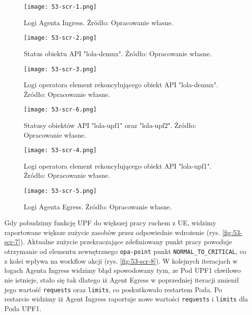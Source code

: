\begin{figure}[!h]
    \centering \texttt{[image: 53-scr-1.png]}
    \caption{Logi Agenta Ingress. Źródło: Opracowanie własne.}\label{fig:53-scr-1}
\end{figure}

\begin{figure}[!h]
    \centering \texttt{[image: 53-scr-2.png]}
    \caption{Status obiektu API "lola-demux". Źródło: Opracowanie własne.}\label{fig:53-scr-2}
\end{figure}

\begin{figure}[!h]
    \centering \texttt{[image: 53-scr-3.png]}
    \caption{Logi operatora element rekoncylującego obiekt API "lola-demux". Źródło: Opracowanie własne.}\label{fig:53-scr-3}
\end{figure}

\begin{figure}[!h]
    \centering \texttt{[image: 53-scr-6.png]}
    \caption{Statusy obiektów API "lola-upf1" oraz "lola-upf2". Źródło: Opracowanie własne.}\label{fig:53-scr-6}
\end{figure}

\begin{figure}[!h]
    \centering \texttt{[image: 53-scr-4.png]}
    \caption{Logi operatora element rekoncylującego obiekt API "lola-upf1". Źródło: Opracowanie własne.}\label{fig:53-scr-4}
\end{figure}

\begin{figure}[!h]
    \centering \texttt{[image: 53-scr-5.png]}
    \caption{Logi Agenta Egress. Źródło: Opracowanie własne.}\label{fig:53-scr-5}
\end{figure}

Gdy pobudzimy funkcję UPF do większej pracy ruchem z UE, widzimy raportowane większe zużycie zasobów przez odpowiednie wdrożenie (rys. \ref{fig:53-scr-7}). Aktualne zużycie przekraczające zdefiniowany punkt pracy powoduje otrzymanie od elementu zewnętrznego \texttt{opa-point} punkt \texttt{NORMAL\_TO\_CRITICAL}, co z kolei wpływa na workflow akcji (rys. \ref{fig:53-scr-8}). W kolejnych iteracjach w logach Agenta Ingress widzimy błąd spowodowany tym, ze Pod UPF1 chwilowo nie istnieje, stało się tak dlatego iż Agent Egress w poprzedniej iteracji zmienił jego wartość \texttt{requests} oraz \texttt{limits}, co poskutkowało restartem Poda. Po restarcie widzimy iż Agent Ingress raportuje nowe wartości \texttt{requests} i \texttt{limits} dla Poda UPF1.

